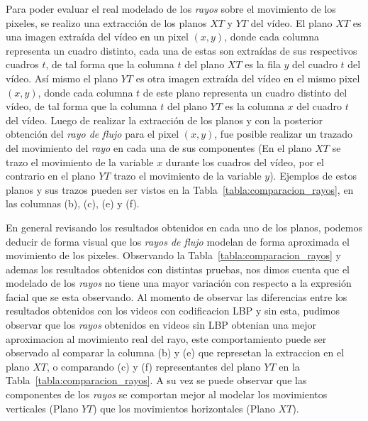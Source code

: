 Para poder evaluar el real modelado de los \textit{rayos} sobre el movimiento de los pixeles, se realizo una extracción de los planos $XT$ y $YT$ del vídeo. El plano $XT$ es una imagen extraída del vídeo en un pixel $(x,y)$, donde cada columna representa un cuadro distinto, cada una de estas son extraídas de sus respectivos cuadros $t$, de tal forma que la columna $t$ del plano $XT$ es la fila $y$ del cuadro $t$ del vídeo. Así mismo el plano $YT$ es otra imagen extraída del vídeo en el mismo pixel $(x,y)$, donde cada columna $t$ de este plano representa un cuadro distinto del vídeo, de tal forma que la columna $t$ del plano $YT$ es la columna $x$ del cuadro $t$ del vídeo. Luego de realizar la extracción de los planos y con la posterior obtención del \textit{rayo de flujo} para el pixel $(x,y)$, fue posible realizar un trazado del movimiento del \textit{rayo} en cada una de sus componentes (En el plano $XT$ se trazo el movimiento de la variable $x$ durante los cuadros del vídeo, por el contrario en el plano $YT$ trazo el movimiento de la variable $y$). Ejemplos de estos planos y sus trazos pueden ser vistos en la Tabla~\ref{tabla:comparacion_rayos}, en las columnas (b), (c), (e) y (f).

En general revisando los resultados obtenidos en cada uno de los planos, podemos deducir de forma visual que los \textit{rayos de flujo} modelan de forma aproximada el movimiento de los pixeles. Observando la Tabla~\ref{tabla:comparacion_rayos} y ademas los resultados obtenidos con distintas pruebas, nos dimos cuenta que el modelado de los \textit{rayos} no tiene una mayor variación con respecto a la expresión facial que se esta observando. Al momento de observar las diferencias entre los resultados obtenidos con los videos con codificacion LBP y sin esta, pudimos observar que los \textit{rayos} obtenidos en videos sin LBP obtenian una mejor aproximacion al movimiento real del rayo, este comportamiento puede ser observado al comparar la columna (b) y (e) que represetan la extraccion en el plano $XT$, o comparando (c) y (f) representantes del plano $YT$ en la Tabla~\ref{tabla:comparacion_rayos}. A su vez se puede observar que las componentes de los \textit{rayos} se comportan mejor al modelar los movimientos verticales (Plano $YT$) que los movimientos horizontales (Plano $XT$).

